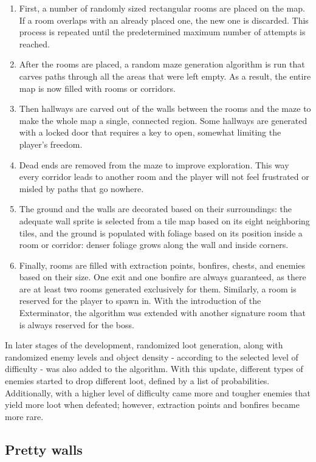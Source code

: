 \begin{enumerate}
  \item First, a number of randomly sized rectangular rooms are placed on the map. If a room overlaps with an already placed one, the new one is discarded. This process is repeated until the predetermined maximum number of attempts is reached.
  \item After the rooms are placed, a random maze generation algorithm is run that carves paths through all the areas that were left empty. As a result, the entire map is now filled with rooms or corridors.
  \item Then hallways are carved out of the walls between the rooms and the maze to make the whole map a single, connected region. Some hallways are generated with a locked door that requires a key to open, somewhat limiting the player's freedom.
  \item Dead ends are removed from the maze to improve exploration. This way every corridor leads to another room and the player will not feel frustrated or misled by paths that go nowhere.
  \item The ground and the walls are decorated based on their surroundings: the adequate wall sprite is selected from a tile map based on its eight neighboring tiles, and the ground is populated with foliage based on its position inside a room or corridor: denser foliage grows along the wall and inside corners.
  \item Finally, rooms are filled with extraction points, bonfires, chests, and enemies based on their size. One exit and one bonfire are always guaranteed, as there are at least two rooms generated exclusively for them. Similarly, a room is reserved for the player to spawn in. With the introduction of the Exterminator, the algorithm was extended with another signature room that is always reserved for the boss.
\end{enumerate}

In later stages of the development, randomized loot generation, along with randomized enemy levels and object density - according to the selected level of difficulty - was also added to the algorithm. With this update, different types of enemies started to drop different loot, defined by a list of probabilities. Additionally, with a higher level of difficulty came more and tougher enemies that yield more loot when defeated; however, extraction points and bonfires became more rare.



\subsection{Pretty walls}

